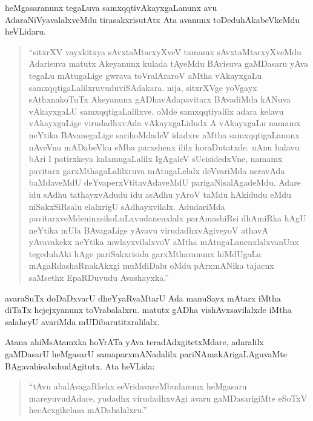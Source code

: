 heMgasaranunx tegaLuva samxqqtivAkayxgaLanunx avu AdaraNiVyavalalxveMdu tirasakxri\-sutAtx Ata avanunx toDeduhAkabeVkeMdu heVLidaru.
\begin{quote}
``sitxrXV vayxkitxya sAvxtaMtarxyXveV tamamx sAvxtaMtarxyXveMdu Adarisuva matutx Ake\-yanunx kulada tAyeMdu BAvisuva gaMDasaru yAva tegaLu mAtu\-gaLige gwrava toVralAraroV aMtha vAkayxgaLu samxqqtigaLalilxruvudu\break viSAdakara. nija, sitxrXVge yoVgayx sAthxnakoTuTx Akeyanunx gADhavAda\break pavitarx BAvadiMda kANuva vAkayxgaLU samxqqtigaLalilxve. oMde samxqqtiyalilx adara kelavu vAkayxgaLige virudadhxvAda vAkayxgaLidudx A vAkayxgaLu namamx neYtika BAvanegaLige sarihoMdadeV idadxre aMtha samxqqtigaLanunx nAveVnu mADabeVku eMba parxshenx ililx horaDutatxde. nAnu halavu bAri I patirxkeya kalamugaLalilx IgAgaleV sUcisidedxVne, namamx pavitarx garxMtha\-gaLalilxruva mAtugaLelalx deVvariMda neravAda baMdaveMdU deYvaperxVtita\-vAdaveMdU parigaNisalAgadeMdu. Adare idu sAdhu tathayxvAdudu idu asAdhu yAroV taMdu hAkidudu eMdu niSakxSiRsalu elalxrigU sAdhayxvilalx. AdudariMda pavitarxveMdeninxsikoLuLxvudanenxlalx parAmashiRsi dhAmiRka hAgU neYtika mUla BAvagaLige yAvavu virudadhxvAgiveyoV athavA yAvavakekx neYtika mwlayxvilalxvoV aMtha mAtugaLanenxlalxvanUnx tegeduhAki hAge pariSakxrisida garxMthavanunx hiMdUgaLa mAgaRdashaRnakAkxgi muMdiDalu oMdu pArxmANika tajacnx saMsethx EpaRDuvudu Avashayxka.''
\end{quote}

avaraSuTx doDaDxvarU dheYyaRvaMtarU Ada manuSayx mAtarx iMtha diTaTx hejejxyanunx toVrabalalxru. matutx gADha vishAvxsavilalxde iMtha salaheyU avariMda mUDibarutitxralilalx.

Atana ahiMsAtamxka hoVrATa yAva teradAdxgitetxMdare, adaralilx gaMDasarU heMgasarU samaparxmANadalilx pariNAmakArigaLAguvaMte BAgavahisabahudAgitutx. Ata heVLida:
\begin{quote}
``tAvu abalAvagaRkekx seVridavareMbudanunx heMgasaru mareyuvudAdare, yudadhx virudadhxvAgi avaru gaMDasarigiMte eSoTxV hecAcxgi\break kelasa mADabalalxru.''
\end{quote}

